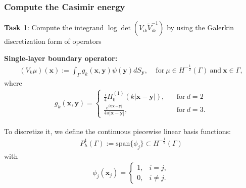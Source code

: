 \documentclass[dvipsnames,10pt]{beamer}
\begin{document}
\begin{frame}
    \frametitle{Compute the Casimir energy}
    \vspace{0.3cm}
\textbf{Task 1}: Compute the integrand $\log\det\left(V_{\mathrm{i}k}\tilde{V}_{\mathrm{i}k}^{-1}\right)$ by using the Galerkin discretization form of operators
\vspace{0.2cm}

\textbf{Single-layer boundary operator:}
\begin{align*}
    (V_{k}\mu)(\boldsymbol{x}) := \int_{\Gamma}g_{k}(\boldsymbol{x},\boldsymbol{y})\psi(\boldsymbol{y})dS_{\boldsymbol{y}}, \ \ \ \ \ 
    \text{for}\ \mu\in H^{-\frac{1}{2}}(\Gamma) \  \text{and} \ \boldsymbol{x}\in\Gamma,
\end{align*}
where \begin{align*}
    g_{k}(\boldsymbol{x},\boldsymbol{y}) = \begin{cases}
          \frac{\mathrm{i}}{4}H_{0}^{(1)}(k|\boldsymbol{x}-\boldsymbol{y}|), \ \ \ \ &\text{for} \ d = 2\\
          \frac{e^{ik|\boldsymbol{x}-\boldsymbol{y}|}}{4\pi|\boldsymbol{x} - \boldsymbol{y}|}, \ \ \ \ &\text{for} \ d = 3.
        \end{cases}
\end{align*}
\vspace{0.2cm}

To discretize it, we define the continuous piecewise linear basis functions:
\begin{align*}
    P_{h}^{1}(\Gamma) := \text{span}\{\phi_{j}\} \subset H^{-\frac{1}{2}}(\Gamma)
\end{align*}
with 
\begin{align*}
    \phi_{j}(\boldsymbol{x}_{j}) = \begin{cases}
        1, & i = j,\\
        0, & i\neq j.
    \end{cases}
\end{align*}

\end{frame}
\end{document}
